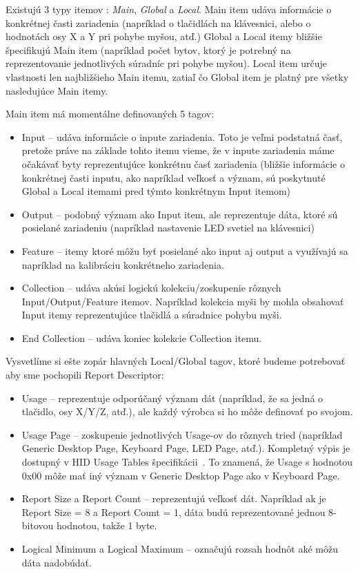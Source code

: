 Existujú 3 typy itemov : \textit{Main}, \textit{Global} a \textit{Local}. Main item udáva informácie o konkrétnej časti zariadenia (napríklad o tlačidlách na klávesnici, alebo o hodnotách osy X a Y pri pohybe myšou, atď.) Global a Local itemy bližšie špecifikujú Main item (napríklad počet bytov, ktorý je potrebný na reprezentovanie jednotlivých súradníc pri pohybe myšou). Local item určuje vlastnosti len najbližšieho Main itemu, zatiaľ čo Global item je platný pre všetky nasledujúce Main itemy.

Main item má momentálne definovaných 5 tagov:
\begin{itemize}
\item Input -- udáva informácie o inpute zariadenia. Toto je veľmi podstatná časť, pretože práve na základe tohto itemu vieme, že v inpute zariadenia máme očakávať byty reprezentujúce konkrétnu časť zariadenia (bližšie informácie o konkrétnej časti inputu, ako napríklad veľkosť a význam, sú poskytnuté Global a Local itemami pred týmto konkrétnym Input itemom)
\item Output -- podobný význam ako Input item, ale reprezentuje dáta, ktoré sú posielané zariadeniu (napríklad nastavenie LED svetiel na klávesnici)
\item Feature -- itemy ktoré môžu byť posielané ako input aj output a využívajú sa napríklad na kalibráciu konkrétneho zariadenia.
\item Collection -- udáva akúsi logickú kolekciu/zoskupenie rôznych Input/Output/Feature itemov. Napríklad kolekcia myši by mohla obsahovať Input itemy reprezentujúce tlačidlá a súradnice pohybu myši.
\item End Collection -- udáva koniec kolekcie Collection itemu.
\end{itemize}

Vysvetlíme si ešte zopár hlavných Local/Global tagov, ktoré budeme potrebovať aby sme pochopili Report Descriptor:
\begin{itemize}
\item Usage -- reprezentuje odporúčaný význam dát (napríklad, že sa jedná o tlačidlo, osy X/Y/Z, atď.), ale každý výrobca si ho môže definovať po svojom.
\item Usage Page -- zoskupenie jednotlivých Usage-ov do rôznych tried (napríklad Generic Desktop Page, Keyboard Page, LED Page, atď.). Kompletný výpis je dostupný v HID Usage Tables špecifikácii~\cite{usage_pages}. To znamená, že Usage s hodnotou 0x00 môže mať iný význam v Generic Desktop Page ako v Keyboard Page.
\item Report Size a Report Count -- reprezentujú veľkosť dát. Napríklad ak je Report Size = 8 a Report Count = 1, dáta budú reprezentované jednou 8-bitovou hodnotou, takže 1 byte.
\item Logical Minimum a Logical Maximum -- označujú rozsah hodnôt aké môžu dáta nadobúdať.
\end{itemize}


